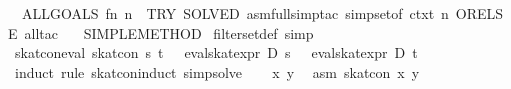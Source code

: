 \begin{isabellebody}
\ \ ALLGOALS\ {}fn\ n\ {}{}\ TRY\ {}SOLVED{}\ {}asm{}full{}simp{}tac\ {}simpset{}of\ ctxt{}{}\ n{}\ ORELSE\ all{}tac{}\isanewline
\ \ {}{}\ SIMPLE{}METHOD{}\isanewline
{}%
\endisatagML
{\isafoldML}%
%
\isadelimML
\isanewline
%
\endisadelimML
\isanewline
{}\isamarkupfalse%
\ filter{}set{}def\ {}simp{}\isanewline
\isanewline
{}\isamarkupfalse%
\ skat{}con{}eval{}\ {}skat{}con\ s\ t\ {}\ {}{}{}\ eval{}skat{}expr\ D\ s\ {}\ {}\ eval{}skat{}expr\ D\ t\ {}{}\isanewline
%
\isadelimproof
%
\endisadelimproof
%
\isatagproof
{}\isamarkupfalse%
\ {}induct\ rule{}\ skat{}con{}induct{}\ simp{}solve{}\isanewline
\ \ \isamarkupfalse%
\ x\ y\ \isamarkupfalse%
\ asm{}{}\ {}skat{}con\ x\ y{}\isanewline

\end{isabellebody}
